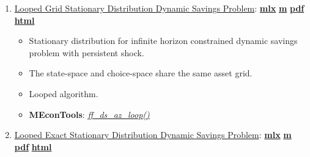 \documentclass[
]{book}
\providecommand{\tightlist}{%
  \setlength{\itemsep}{0pt}\setlength{\parskip}{0pt}}
\begin{document}
\begin{enumerate}
\def\labelenumi{\arabic{enumi}.}
\tightlist
\item
  \href{https://fanwangecon.github.io/MEconTools/MEconTools/doc/ds/htmlpdfm/fx_ds_az_loop.html}{Looped Grid Stationary Distribution Dynamic Savings Problem}: \href{https://github.com/FanWangEcon/MEconTools/blob/master/MEconTools/doc/ds/fx_ds_az_loop.mlx}{\textbf{mlx}} \textbar{} \href{https://github.com/FanWangEcon/MEconTools/blob/master/MEconTools/doc/ds/htmlpdfm/fx_ds_az_loop.m}{\textbf{m}} \textbar{} \href{https://github.com/FanWangEcon/MEconTools/blob/master/MEconTools/doc/ds/htmlpdfm/fx_ds_az_loop.pdf}{\textbf{pdf}} \textbar{} \href{https://fanwangecon.github.io/MEconTools/MEconTools/doc/ds/htmlpdfm/fx_ds_az_loop.html}{\textbf{html}}

  \begin{itemize}
  \tightlist
  \item
    Stationary distribution for infinite horizon constrained dynamic savings problem with persistent shock.
  \item
    The state-space and choice-space share the same asset grid.
  \item
    Looped algorithm.
  \item
    \textbf{MEconTools}: \emph{\href{https://github.com/FanWangEcon/MEconTools/blob/master/MEconTools/ds/ff_ds_az_loop.m}{ff\_ds\_az\_loop()}}
  \end{itemize}
\item
  \href{https://fanwangecon.github.io/MEconTools/MEconTools/doc/ds/htmlpdfm/fx_ds_az_cts_loop.html}{Looped Exact Stationary Distribution Dynamic Savings Problem}: \href{https://github.com/FanWangEcon/MEconTools/blob/master/MEconTools/doc/ds/fx_ds_az_cts_loop.mlx}{\textbf{mlx}} \textbar{} \href{https://github.com/FanWangEcon/MEconTools/blob/master/MEconTools/doc/ds/htmlpdfm/fx_ds_az_cts_loop.m}{\textbf{m}} \textbar{} \href{https://github.com/FanWangEcon/MEconTools/blob/master/MEconTools/doc/ds/htmlpdfm/fx_ds_az_cts_loop.pdf}{\textbf{pdf}} \textbar{} \href{https://fanwangecon.github.io/MEconTools/MEconTools/doc/ds/htmlpdfm/fx_ds_az_cts_loop.html}{\textbf{html}}


\end{enumerate}
\end{document}
